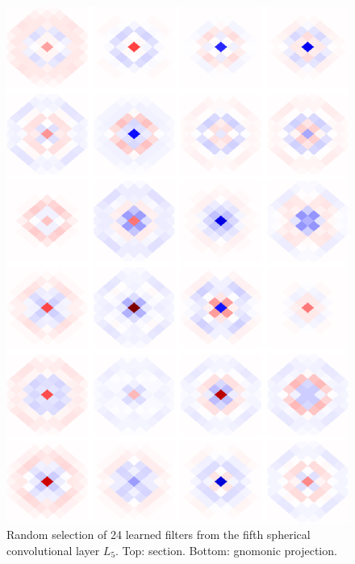 \documentclass[final,twocolumn,3p,times,sort&compress]{elsarticle}
\newcommand{\1}{\b{1}}              %
\newcommand{\0}{\b{0}}              %
\begin{document}
\begin{figure}
	\includegraphics[width=\linewidth]{gnonomic_filter_last}
	\caption{Random selection of 24 learned filters from the fifth spherical convolutional layer $L_5$. Top: section. Bottom: gnomonic projection.}
	\label{fig:learned_filter}
\end{figure}
\end{document}
